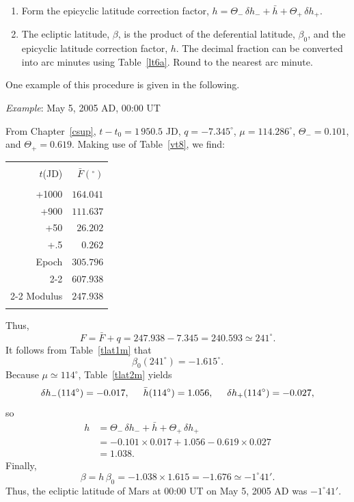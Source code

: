 \begin{enumerate}
\item Form the epicyclic latitude correction factor, $h = \Theta_-\,\delta h_-+ \bar{h}
+ \Theta_+\,\delta h_+$.

\item The ecliptic latitude, $\beta$, is the product of the deferential latitude, 
$\beta_0$,  and the epicyclic latitude correction factor, $h$.  The decimal fraction can
be converted into arc minutes
using Table~\ref{lt6a}. Round to the nearest arc minute. 
\end{enumerate}
One example of this procedure is given in the following.

\begin{center}
 {\em Example}: May 5, 2005 AD, 00:00 UT
 \end{center}
From Chapter~\ref{csup}, $t-t_0=1\,950.5$ JD, 
$q= -7.345^\circ$,  $\mu= 114.286^\circ$, $\Theta_-=0.101$, and
$\Theta_+ = 0.619$.
 Making use of
Table~\ref{vt8}, we find:
\begin{center}
\begin{tabular}{rr}
&\\
$t$(JD) & $\bar{F}(^\circ)$\\[-2ex]
&\\
+1000 & $164.041$ \\
+900 & $111.637$\\
+50 & $26.202$ \\
+.5 & $0.262$\\
Epoch & $305.796$ \\\cline{2-2}
&$607.938$ \\\cline{2-2}
Modulus & $247.938$ \\ 
&\\
\end{tabular}
\end{center}
Thus,
$$
F = \bar{F} + q = 247.938-7.345 = 240.593\simeq 241^\circ.
$$
It follows from Table~\ref{tlat1m} that
$$
\beta_0(241^\circ) = -1.615^\circ.
$$
Because $\mu\simeq 114^\circ$, Table~\ref{tlat2m} yields
$$
\delta h_-(114^\circ) = -0.017,\mbox{\hspace{0.5cm}}\bar{h}(114^\circ)=1.056, \mbox{\hspace{0.5cm}}\delta h_+(114^\circ) = -0.027,
$$
so
\begin{align*}
h &= \Theta_-\,\delta h_- + \bar{h}+\Theta_+\,\delta h_+ \\[0.5ex]
&= -0.101\times 0.017+1.056-0.619\times 0.027\\[0.5ex]
& = 1.038.
\end{align*}
Finally,
$$
\beta = h\,\beta_0 = -1.038\times 1.615 = -1.676 \simeq -1^\circ 41'.
$$
Thus,
the ecliptic latitude of Mars at 00:00 UT on May 5, 2005 AD was $-1^\circ 41'$.

